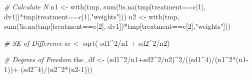 \documentclass[
]{article}
\newenvironment{Shaded}{\begin{snugshade}}{\end{snugshade}}
\newcommand{\CommentTok}[1]{\textcolor[rgb]{0.56,0.35,0.01}{\textit{#1}}}
\newcommand{\DecValTok}[1]{\textcolor[rgb]{0.00,0.00,0.81}{#1}}
\newcommand{\FunctionTok}[1]{\textcolor[rgb]{0.00,0.00,0.00}{#1}}
\newcommand{\NormalTok}[1]{#1}
\newcommand{\OtherTok}[1]{\textcolor[rgb]{0.56,0.35,0.01}{#1}}
\newcommand{\SpecialCharTok}[1]{\textcolor[rgb]{0.00,0.00,0.00}{#1}}
\newcommand{\StringTok}[1]{\textcolor[rgb]{0.31,0.60,0.02}{#1}}
\begin{document}
\begin{Shaded}
\begin{Highlighting}[]
  \CommentTok{\# Calculate N}
\NormalTok{  n1 }\OtherTok{\textless{}{-}} \FunctionTok{with}\NormalTok{(tmp, }\FunctionTok{sum}\NormalTok{(}\SpecialCharTok{!}\FunctionTok{is.na}\NormalTok{(tmp[treatment}\SpecialCharTok{==}\NormalTok{c[}\DecValTok{1}\NormalTok{], dv1])}\SpecialCharTok{*}\NormalTok{tmp[treatment}\SpecialCharTok{==}\NormalTok{c[}\DecValTok{1}\NormalTok{],}\StringTok{"weights"}\NormalTok{]))}
\NormalTok{  n2 }\OtherTok{\textless{}{-}} \FunctionTok{with}\NormalTok{(tmp, }\FunctionTok{sum}\NormalTok{(}\SpecialCharTok{!}\FunctionTok{is.na}\NormalTok{(tmp[treatment}\SpecialCharTok{==}\NormalTok{c[}\DecValTok{2}\NormalTok{], dv1])}\SpecialCharTok{*}\NormalTok{tmp[treatment}\SpecialCharTok{==}\NormalTok{c[}\DecValTok{2}\NormalTok{],}\StringTok{"weights"}\NormalTok{]))}
 
   \CommentTok{\# SE of Difference}
\NormalTok{  se }\OtherTok{\textless{}{-}} \FunctionTok{sqrt}\NormalTok{( sd1}\SpecialCharTok{\^{}}\DecValTok{2}\SpecialCharTok{/}\NormalTok{n1 }\SpecialCharTok{+}\NormalTok{ sd2}\SpecialCharTok{\^{}}\DecValTok{2}\SpecialCharTok{/}\NormalTok{n2)}
  
  \CommentTok{\# Degrees of Freedom}
\NormalTok{  the\_df }\OtherTok{\textless{}{-}}\NormalTok{ (sd1}\SpecialCharTok{\^{}}\DecValTok{2}\SpecialCharTok{/}\NormalTok{n1}\SpecialCharTok{+}\NormalTok{sd2}\SpecialCharTok{\^{}}\DecValTok{2}\SpecialCharTok{/}\NormalTok{n2)}\SpecialCharTok{\^{}}\DecValTok{2}\SpecialCharTok{/}\NormalTok{((sd1}\SpecialCharTok{\^{}}\DecValTok{4}\NormalTok{)}\SpecialCharTok{/}\NormalTok{(n1}\SpecialCharTok{\^{}}\DecValTok{2}\SpecialCharTok{*}\NormalTok{(n1}\DecValTok{{-}1}\NormalTok{))}\SpecialCharTok{+}\NormalTok{ (sd2}\SpecialCharTok{\^{}}\DecValTok{4}\NormalTok{)}\SpecialCharTok{/}\NormalTok{(n2}\SpecialCharTok{\^{}}\DecValTok{2}\SpecialCharTok{*}\NormalTok{(n2}\DecValTok{{-}1}\NormalTok{)))}
  

\end{Highlighting}
\end{Shaded}
\end{document}
